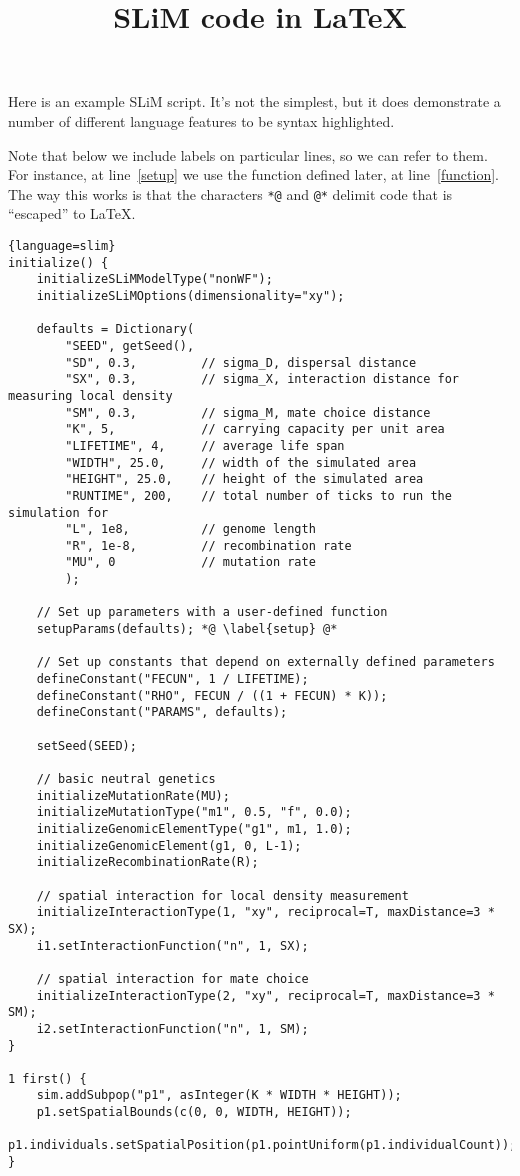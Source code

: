\documentclass{article}
\title{SLiM code in \LaTeX}
\begin{document}
Here is an example SLiM script.
It's not the simplest, but it does demonstrate a number of different language features
to be syntax highlighted.

Note that below we include labels on particular lines,
so we can refer to them.
For instance,
at line~\ref{setup} we use the function defined later,
at line~\ref{function}.
The way this works is that the characters \verb|*@| and \verb|@*| delimit
code that is ``escaped'' to \LaTeX.

\begin{lstlisting}{language=slim}
initialize() {
	initializeSLiMModelType("nonWF");
	initializeSLiMOptions(dimensionality="xy");
	
	defaults = Dictionary(
		"SEED", getSeed(),
		"SD", 0.3,         // sigma_D, dispersal distance
		"SX", 0.3,         // sigma_X, interaction distance for measuring local density
		"SM", 0.3,         // sigma_M, mate choice distance
		"K", 5,            // carrying capacity per unit area
		"LIFETIME", 4,     // average life span
		"WIDTH", 25.0,     // width of the simulated area
		"HEIGHT", 25.0,    // height of the simulated area
		"RUNTIME", 200,    // total number of ticks to run the simulation for
		"L", 1e8,          // genome length
		"R", 1e-8,         // recombination rate
		"MU", 0            // mutation rate
		);	
	
	// Set up parameters with a user-defined function
    setupParams(defaults); *@ \label{setup} @*
	
	// Set up constants that depend on externally defined parameters
	defineConstant("FECUN", 1 / LIFETIME);
	defineConstant("RHO", FECUN / ((1 + FECUN) * K));
	defineConstant("PARAMS", defaults);
	
	setSeed(SEED);
	
	// basic neutral genetics
	initializeMutationRate(MU);
	initializeMutationType("m1", 0.5, "f", 0.0);
	initializeGenomicElementType("g1", m1, 1.0);
	initializeGenomicElement(g1, 0, L-1);
	initializeRecombinationRate(R);
	
	// spatial interaction for local density measurement
	initializeInteractionType(1, "xy", reciprocal=T, maxDistance=3 * SX);
	i1.setInteractionFunction("n", 1, SX);
	
	// spatial interaction for mate choice
	initializeInteractionType(2, "xy", reciprocal=T, maxDistance=3 * SM);
	i2.setInteractionFunction("n", 1, SM);
}

1 first() {
	sim.addSubpop("p1", asInteger(K * WIDTH * HEIGHT));
	p1.setSpatialBounds(c(0, 0, WIDTH, HEIGHT));
	p1.individuals.setSpatialPosition(p1.pointUniform(p1.individualCount));
}


\end{lstlisting}
\end{document}
